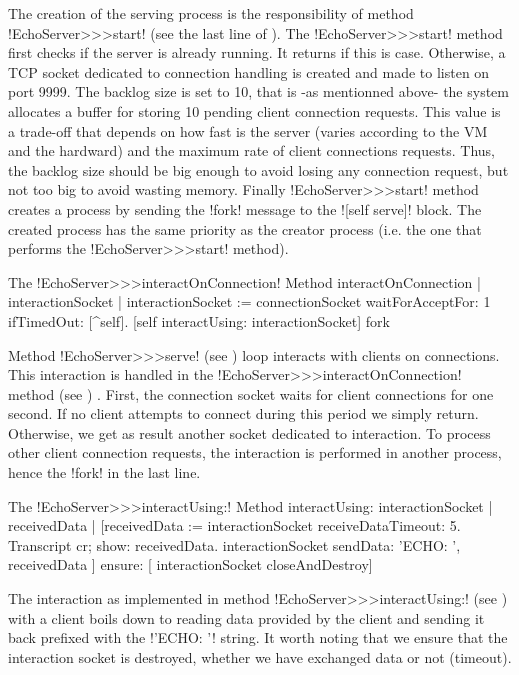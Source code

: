 \documentclass[a4paper,10pt,twoside]{book}
\begin{document}
The creation of the serving process is the responsibility of method \ct!EchoServer>>>start! (see the last line of ).
The \ct!EchoServer>>>start! method first checks if the server is already running.
It returns if this is case.
Otherwise, a TCP socket dedicated to connection handling is created and made to listen on port 9999.
The backlog size is set to 10, that is -as mentionned above- the system allocates a buffer for storing 10 pending client connection requests.
This value is a trade-off that depends on how fast is the server (varies according to the VM and the hardward) and the maximum rate of client connections requests.
Thus, the backlog size should be big enough to avoid losing any connection request, but not too big to avoid wasting memory.
Finally \ct!EchoServer>>>start! method creates a process by sending the \ct!fork! message to the \ct![self serve]! block.
The created process has the same priority as the creator process (i.e. the one that performs the \ct!EchoServer>>>start! method).


\begin{method}{The \ct!EchoServer>>>interactOnConnection! Method}
interactOnConnection
	| interactionSocket |
	interactionSocket := connectionSocket waitForAcceptFor: 1 ifTimedOut: [^self].
	[self interactUsing: interactionSocket] fork
\end{method}

Method \ct!EchoServer>>>serve! (see ) loop interacts with clients on connections.
This interaction is handled in the \ct!EchoServer>>>interactOnConnection! method (see ) .
First, the connection socket waits for client connections for one second.
If no client attempts to connect during this period we simply return.
Otherwise, we get as result another socket dedicated to interaction.
To process other client connection requests, the interaction is performed in another process, hence the \ct!fork! in the last line.

\begin{method}{The \ct!EchoServer>>>interactUsing:! Method}
interactUsing: interactionSocket
	| receivedData |
	[receivedData := interactionSocket receiveDataTimeout: 5.
	 Transcript cr; show: receivedData.
	 interactionSocket sendData: 'ECHO: ', receivedData
	] ensure: [
	 interactionSocket closeAndDestroy]
\end{method}

The interaction as implemented in method \ct!EchoServer>>>interactUsing:! (see ) with a client boils down to reading data provided by the client and sending it back prefixed with the \ct!'ECHO: '! string.
It worth noting that we ensure that the interaction socket is destroyed, whether we have exchanged data or not (timeout).
\end{document}
